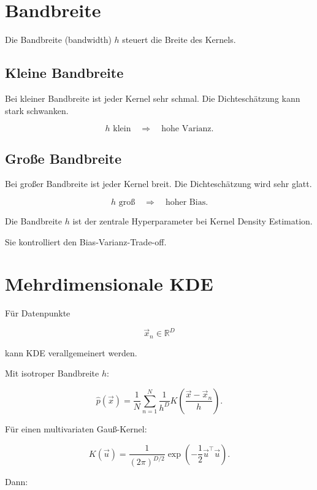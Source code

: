 \section{Bandbreite}

Die Bandbreite (bandwidth) \(h\) steuert die Breite des Kernels.

\subsection{Kleine Bandbreite}

Bei kleiner Bandbreite ist jeder Kernel sehr schmal.
Die Dichteschätzung kann stark schwanken.

\[
    h \text{ klein}
    \quad
    \Rightarrow
    \quad
    \text{hohe Varianz}.
\]

\subsection{Große Bandbreite}

Bei großer Bandbreite ist jeder Kernel breit.
Die Dichteschätzung wird sehr glatt.

\[
    h \text{ groß}
    \quad
    \Rightarrow
    \quad
    \text{hoher Bias}.
\]

\begin{conceptbox}
Die Bandbreite \(h\) ist der zentrale Hyperparameter bei Kernel Density Estimation.

Sie kontrolliert den Bias-Varianz-Trade-off.
\end{conceptbox}

\section{Mehrdimensionale KDE}

Für Datenpunkte

\[
    \vec{x}_n\in\mathbb{R}^D
\]

kann KDE verallgemeinert werden.

Mit isotroper Bandbreite \(h\):

\[
    \hat{p}(\vec{x})
    =
    \frac{1}{N}
    \sum_{n=1}^{N}
    \frac{1}{h^D}
    K
    \left(
        \frac{\vec{x}-\vec{x}_n}{h}
    \right).
\]

Für einen multivariaten Gauß-Kernel:

\[
    K(\vec{u})
    =
    \frac{1}{(2\pi)^{D/2}}
    \exp
    \left(
        -\frac{1}{2}
        \vec{u}^{\top}\vec{u}
    \right).
\]

Dann:

